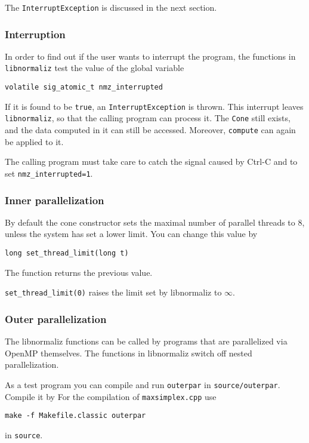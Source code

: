 \documentclass[12pt,a4paper]{scrartcl}
\theoremstyle{definition}
\begin{document}
\begin{small}
The \verb|InterruptException| is discussed in the next section.

\subsubsection{Interruption}

In order to find out if the user wants to interrupt the program, the functions in \verb|libnormaliz| test the value of the global variable
\begin{Verbatim}
volatile sig_atomic_t nmz_interrupted
\end{Verbatim}
If it is found to be \verb|true|, an \verb|InterruptException| is thrown. This interrupt leaves \verb|libnormaliz|, so that the calling program can process it. The \verb|Cone| still exists, and the data computed in it can still be accessed. Moreover, \verb|compute| can again be applied to it.

The calling program must take care to catch the signal caused by Ctrl-C and to set \verb|nmz_interrupted=1|.

\subsubsection{Inner parallelization}

By default the cone constructor sets the maximal number of parallel threads to $8$, unless the system has set a lower limit. You can change this value by
\begin{Verbatim}
long set_thread_limit(long t)
\end{Verbatim}
The function returns the previous value.

\verb|set_thread_limit(0)| raises the limit set by libnormaliz to $\infty$.

\subsubsection{Outer parallelization}

The libnormaliz functions can be called by programs that are parallelized via OpenMP themselves. The functions in libnormaliz switch off nested parallelization.

As a test program you can compile and run \verb|outerpar| in \verb|source/outerpar|. Compile it by For the compilation of \verb|maxsimplex.cpp| use
\begin{Verbatim}
make -f Makefile.classic outerpar
\end{Verbatim}
in \verb|source|.


\end{small}
\end{document}
